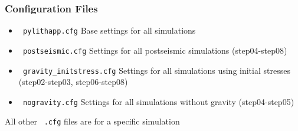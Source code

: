 \documentclass{beamer}
\begin{document}
\begin{frame}
  \frametitle{Configuration Files}

  \begin{itemize}
  \item {\tt\color{green} pylithapp.cfg} Base settings for all
    simulations
  \item {\tt\color{green} postseismic.cfg} Settings for all
    postseismic simulations (step04-step08)
  \item {\tt\color{green} gravity\_initstress.cfg} Settings for all
    simulations using initial stresses (step02-step03, step06-step08)
  \item {\tt\color{green} nogravity.cfg} Settings for all
    simulations without gravity (step04-step05)
  \end{itemize}

  \vfill
  All other {\tt\color{green} .cfg} files are for a specific simulation
  \vfill
  
\end{frame}


\end{document}
